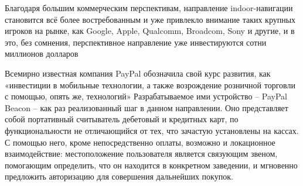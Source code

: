 Благодаря большим коммерческим перспективам, направление indoor-на\-ви\-га\-ции становится всё более востребованным и уже привлекло внимание таких крупных игроков на рынке, как Google, Apple, Qualcomm, Broadcom, Sony и другие, и в это, без сомнения, перспективное направление уже инвестируются сотни миллионов долларов %

Всемирно известная компания PayPal обозначила свой курс развития, как «инвестиции в мобильные технологии, а также возрождение розничной торговли с помощью, опять же, технологий» %
Разрабатываемое ими устройство – PayPal Beacon – как раз реализованный шаг в данном направлении. Оно представляет собой портативный считыватель дебетовый и кредитных карт, по функциональности не отличающийся от тех, что зачастую установлены на кассах. С помощью него, кроме непосредственно оплаты, возможно и локационное взаимодействие: местоположение пользователя является связующим звеном, помогающим определить, что он находится в конкретном заведении, и мгновенно предложить авторизацию для совершения дальнейших покупок.